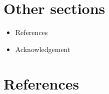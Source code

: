 \documentclass[
  letterpaper,
  DIV=11,
  numbers=noendperiod]{scrreprt}
\newlength{\cslhangindent}
\newenvironment{CSLReferences}[2] %
 {\begin{list}{}{%
  \setlength{\itemindent}{0pt}
  \setlength{\leftmargin}{0pt}
  \setlength{\parsep}{0pt}
  \ifodd #1
   \setlength{\leftmargin}{\cslhangindent}
   \setlength{\itemindent}{-1\cslhangindent}
  \fi
  \setlength{\itemsep}{#2\baselineskip}}}
 {\end{list}}
\begin{document}

\chapter{Other sections}\label{other-sections}

\begin{itemize}
\item
  References
\item
  Acknowledgement
\end{itemize}


\chapter*{References}\label{references}


\label{refs}
\begin{CSLReferences}{0}{1}
\end{CSLReferences}
\end{document}
